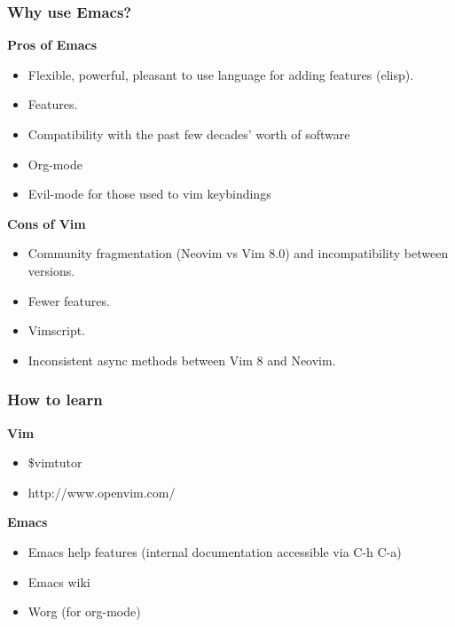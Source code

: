 \documentclass[8pt]{beamer}
\begin{document}
\begin{frame}
  \frametitle{Why use Emacs?}
  \begin{multicols}{2}
    \textbf{Pros of Emacs}
    \begin{itemize}
    \item Flexible, powerful, pleasant to use language for adding
      features (elisp).
    \item Features.
    \item Compatibility with the past few decades' worth of software
    \item Org-mode
    \item Evil-mode for those used to vim keybindings
    \end{itemize}
    \columnbreak
    \textbf{Cons of Vim}
    \begin{itemize}
    \item Community fragmentation (Neovim vs Vim 8.0) and
      incompatibility between versions.
    \item Fewer features.
    \item Vimscript.
    \item Inconsistent async methods between Vim 8 and Neovim.
    \end{itemize}
  \end{multicols}
\end{frame}

\begin{frame}
  \frametitle{How to learn}
  \textbf{Vim}
  \begin{itemize}
  \item \$vimtutor
  \item http://www.openvim.com/
  \end{itemize}
  \textbf{Emacs}
  \begin{itemize}
  \item Emacs help features (internal documentation accessible via C-h C-a)
  \item Emacs wiki
  \item Worg (for org-mode)
  \end{itemize}
\end{frame}
\end{document}
